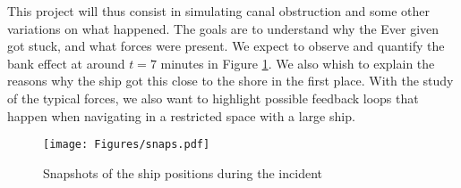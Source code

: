\documentclass[a4paper]{article}
\begin{document}
\begin{center}
\end{center}

This project will thus consist in simulating canal obstruction and some other variations on what happened. The goals are to understand why the Ever given got stuck, and what forces were present. We expect to observe and quantify the bank effect at around $t=7$ minutes in Figure \ref{fig:snaps}. We also whish to explain the reasons why the ship got this close to the shore in the first place. With the study of the typical forces, we also want to highlight possible feedback loops that happen when navigating in a restricted space with a large ship.

\begin{figure}[hbtb]
	\centering
	\texttt{[image: Figures/snaps.pdf]}
	\caption{Snapshots of the ship positions during the incident}
	\label{fig:snaps}
\end{figure}
\end{document}
